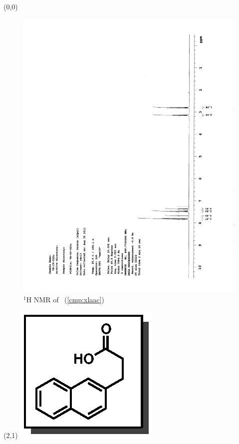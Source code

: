 \begin{textblock}{20}(0,0)
\begin{figure}[htb]
\caption{$^1$H NMR of \CMPxlaac\ (\ref{cmp:xlaac})}
\includegraphics[scale=0.75, trim = 0mm 0mm 0mm 5mm,
clip]{chp_asymmetric/images/nmr/xlaacH}
\vspace{-100pt}
\end{figure}
\end{textblock}
\begin{textblock}{1}(2,1)
\includegraphics[scale=0.8, angle=90]{chp_asymmetric/images/xlaac}
\end{textblock}
